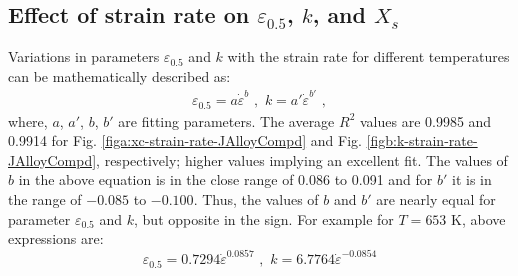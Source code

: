 \documentclass[a4paper, 11pt, dvipsnames]{article}
\begin{document}
\subsection{Effect of strain rate on \texorpdfstring{$\varepsilon_{0.5}$}{e0.5}, \texorpdfstring{$k$}{k}, and \texorpdfstring{$X_s$}{Xs}}
Variations in parameters $\varepsilon_{0.5}$ and $k$ with the strain rate for different temperatures can be mathematically described as:
\begin{equation}\label{eq:e50-k-edot}
\begin{aligned}
\varepsilon_{0.5} = a \dot{\varepsilon}^b \,\, , \,\, k = a' \dot{\varepsilon}^{b'} \,\, ,
\end{aligned}
\end{equation}
where, $a$, $a'$, $b$, $b'$ are fitting parameters. The average $R^2$ values are 0.9985 and 0.9914 for Fig. \ref{figa:xc-strain-rate-JAlloyCompd} and Fig. \ref{figb:k-strain-rate-JAlloyCompd}, respectively; higher values implying an excellent fit. The values of $b$ in the above equation is in the close range of 0.086 to 0.091 and for $b'$ it is in the range of $-0.085$ to $-0.100$. Thus, the values of $b$ and $b'$ are nearly equal for parameter $\varepsilon_{0.5}$ and $k$, but opposite in the sign. For example for $T = 653$ K, above expressions are:
\begin{equation*}
\varepsilon_{0.5} = 0.7294\dot{\varepsilon}^{0.0857} \,\, , \,\, k = 6.7764\dot{\varepsilon}^{-0.0854}
\end{equation*}
\end{document}
